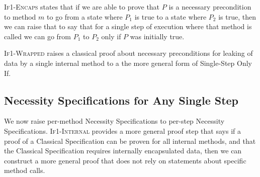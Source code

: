 \textsc{If1-Encaps} states that if we are able to prove that $P$ is 
a necessary precondition to method $m$ to go from a state where 
$P_1$ is true to a state where $P_2$ is true, then we can raise 
that to say that for a single step of execution where that method 
is called we can go from $P_1$ to $P_2$ only if $P$ was initially true.

\textsc{If1-Wrapped} raises a classical proof about necessary preconditions 
for leaking of data by a single internal method to a the more general form of 
Single-Step Only If.

\subsection{Necessity Specifications for Any Single Step}
\label{s:module-proof}

We now raise per-method Necessity Specifications 
to per-step Necessity Specifications. \textsc{If1-Internal} provides a more general proof step that says
if a proof of a Classical Specification can be proven for all internal 
methods, and that the Classical Specification requires internally encapsulated
data, then we can construct a more general proof that does not rely on
statements about specific method calls.


